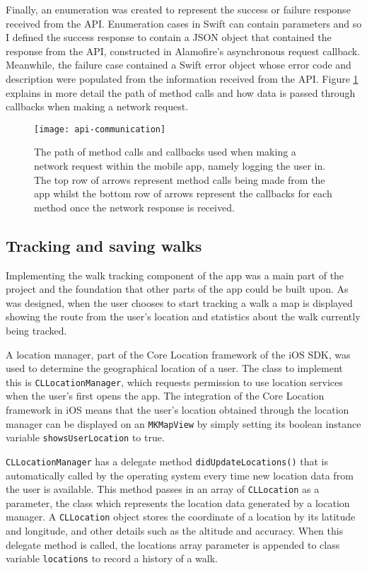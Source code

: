 Finally, an enumeration was created to represent the success or failure response received from the API. Enumeration cases in Swift can contain parameters and so I defined the success response to contain a JSON object that contained the response from the API, constructed in Alamofire's asynchronous request callback. Meanwhile, the failure case contained a Swift error object whose error code and description were populated from the information received from the API. Figure \ref{fig:api-communication} explains in more detail the path of method calls and how data is passed through callbacks when making a network request.

\begin{figure}[hbt]
  \centering
  \texttt{[image: api-communication]}
  \caption{The path of method calls and callbacks used when making a network request within the mobile app, namely logging the user in. The top row of arrows represent method calls being made from the app whilst the bottom row of arrows represent the callbacks for each method once the network response is received.}
  \label{fig:api-communication}
\end{figure}

\subsection{Tracking and saving walks}

Implementing the walk tracking component of the app was a main part of the project and the foundation that other parts of the app could be built upon. As was designed, when the user chooses to start tracking a walk a map is displayed showing the route from the user's location and statistics about the walk currently being tracked.

A location manager, part of the Core Location framework of the iOS SDK, was used to determine the geographical location of a user. The class to implement this is \verb|CLLocationManager|, which requests permission to use location services when the user's first opens the app. The integration of the Core Location framework in iOS means that the user's location obtained through the location manager can be displayed on an \verb|MKMapView| by simply setting its boolean instance variable \verb|showsUserLocation| to true.

\verb|CLLocationManager| has a delegate method \verb|didUpdateLocations()| that is automatically called by the operating system every time new location data from the user is available. This method passes in an array of \verb|CLLocation| as a parameter, the class which represents the location data generated by a location manager. A \verb|CLLocation| object stores the coordinate of a location by its latitude and longitude, and other details such as the altitude and accuracy. When this delegate method is called, the locations array parameter is appended to class variable \verb|locations| to record a history of a walk.


